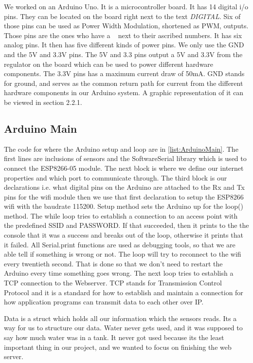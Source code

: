 \documentclass[a4paper,12pt,twoside,openright,titlepage]{book}
\begin{document}
We worked on an Arduino Uno. It is a microcontroller board. It has 14 digital i/o pins. They can be located on the board right next to the text \textit{DIGITAL}. Six of those pins can be used as Power Width Modulation, shortened as PWM, outputs. Those pins are the ones who have a ~ next to their ascribed numbers. It has six analog pins. It then has five different kinds of power pins. We only use the GND and the 5V and 3.3V pins. The 5V and 3.3 pins output a 5V and 3.3V from the regulator on the board which can be used to power different hardware components. The 3.3V pins has a maximum current draw of 50mA. GND stands for ground, and serves as the common return path for current from the different hardware components in our Arduino system. A graphic representation of it can be viewed in section 2.2.1. 

\subsection{Arduino Main}
The code for where the Arduino setup and loop are in \ref{list:ArduinoMain}. The first lines are inclusions of sensors and the SoftwareSerial library which is used to connect the ESP8266-05 module. The next block is where we define our internet properties and which port to communicate through. The third block is our declarations i.e. what digital pins on the Arduino are attached to the Rx and Tx pins for the wifi module then we use that first declaration to setup the ESP8266 wifi with the baudrate 115200. Setup method sets the Arduino up for the loop() method. The while loop tries to establish a connection to an access point with the predefined SSID and PASSWORD. If that succeeded, then it prints to the the console that it was a success and breaks out of the loop, otherwise it prints that it failed. All Serial.print functions are used as debugging tools, so that we are able tell if something is wrong or not. The loop will try to reconnect to the wifi every twentieth second. That is done so that we don't need to restart the Arduino every time something goes wrong. The next loop tries to establish a TCP connection to the Webserver. TCP stands for Transmission Control Protocol and it is a standard for how to establish and maintain a connection for how application programs can transmit data to each other over IP. 

Data is a struct which holds all our information which the sensors reads. Its a way for us to structure our data. Water never gets used, and it was supposed to say how much water was in a tank. It never got used because its the least important thing in our project, and we wanted to focus on finishing the web server.
\end{document}

